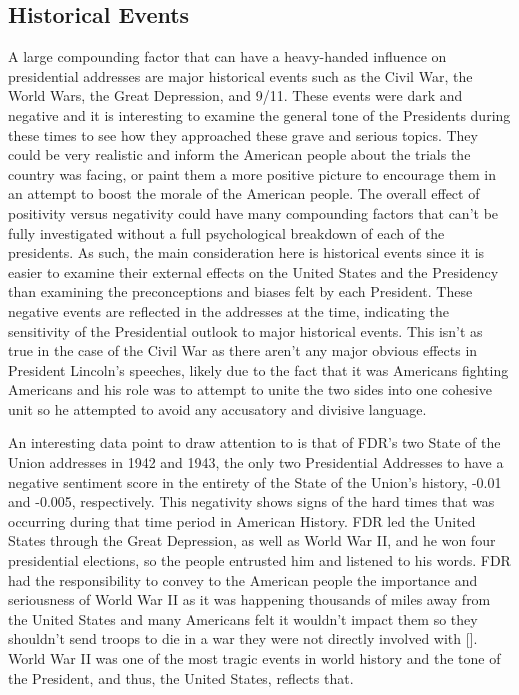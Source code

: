 \subsection{Historical Events}
A large compounding factor that can have a heavy-handed influence on presidential addresses are major historical events such as the Civil War, the World Wars, the Great Depression, and 9/11.
These events were dark and negative and it is interesting to examine the general tone of the Presidents during these times to see how they approached these grave and serious topics.
They could be very realistic and inform the American people about the trials the country was facing, or paint them a more positive picture to encourage them in an attempt to boost the morale of the American people.
The overall effect of positivity versus negativity could have many compounding factors that can't be fully investigated without a full psychological breakdown of each of the presidents.
As such, the main consideration here is historical events since it is easier to examine their external effects on the United States and the Presidency than examining the preconceptions and biases felt by each President.
These negative events are reflected in the addresses at the time, indicating the sensitivity of the Presidential outlook to major historical events.
This isn't as true in the case of the Civil War as there aren't any major obvious effects in President Lincoln's speeches, likely due to the fact that it was Americans fighting Americans and his role was to attempt to unite the two sides into one cohesive unit so he attempted to avoid any accusatory and divisive language.

An interesting data point to draw attention to is that of FDR's two State of the Union addresses in 1942 and 1943, the only two Presidential Addresses to have a negative sentiment score in the entirety of the State of the Union's history, -0.01 and -0.005, respectively.
This negativity shows signs of the hard times that was occurring during that time period in American History.
FDR led the United States through the Great Depression, as well as World War II, and he won four presidential elections, so the people entrusted him and listened to his words.
FDR had the responsibility to convey to the American people the importance and seriousness of World War II as it was happening thousands of miles away from the United States and many Americans felt it wouldn't impact them so they shouldn't send troops to die in a war they were not directly involved with [\cite{roosevelt1964four}].
World War II was one of the most tragic events in world history and the tone of the President, and thus, the United States, reflects that.

